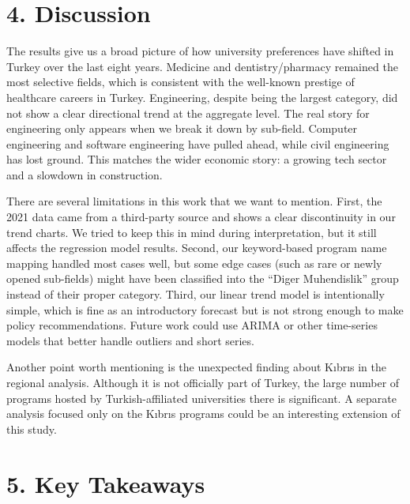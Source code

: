 \documentclass[
  11pt,
  a4paper,
  DIV=11,
  numbers=noendperiod]{scrartcl}
\begin{document}
\section{4. Discussion}\label{discussion}

The results give us a broad picture of how university preferences have
shifted in Turkey over the last eight years. Medicine and
dentistry/pharmacy remained the most selective fields, which is
consistent with the well-known prestige of healthcare careers in Turkey.
Engineering, despite being the largest category, did not show a clear
directional trend at the aggregate level. The real story for engineering
only appears when we break it down by sub-field. Computer engineering
and software engineering have pulled ahead, while civil engineering has
lost ground. This matches the wider economic story: a growing tech
sector and a slowdown in construction.

There are several limitations in this work that we want to mention.
First, the 2021 data came from a third-party source and shows a clear
discontinuity in our trend charts. We tried to keep this in mind during
interpretation, but it still affects the regression model results.
Second, our keyword-based program name mapping handled most cases well,
but some edge cases (such as rare or newly opened sub-fields) might have
been classified into the ``Diger Muhendislik'' group instead of their
proper category. Third, our linear trend model is intentionally simple,
which is fine as an introductory forecast but is not strong enough to
make policy recommendations. Future work could use ARIMA or other
time-series models that better handle outliers and short series.

Another point worth mentioning is the unexpected finding about Kıbrıs in
the regional analysis. Although it is not officially part of Turkey, the
large number of programs hosted by Turkish-affiliated universities there
is significant. A separate analysis focused only on the Kıbrıs programs
could be an interesting extension of this study.

\section{5. Key Takeaways}\label{key-takeaways}
\end{document}
